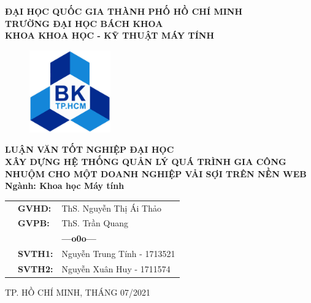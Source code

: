 \documentclass[a4paper]{article}
\begin{document}
\begin{titlepage}
\begin{center}
\textbf{{\Large ĐẠI HỌC QUỐC GIA THÀNH PHỐ HỒ CHÍ MINH \\
TRƯỜNG ĐẠI HỌC BÁCH KHOA \\
KHOA KHOA HỌC - KỸ THUẬT MÁY TÍNH}}
\end{center}

\vspace{0.5cm}

\begin{figure}[h!]
\begin{center}
\includegraphics[width=3.5cm]{Image/hcmut.png}
\end{center}
\end{figure}

\vspace{0.5cm}


\begin{center}
\textbf{{\Large LUẬN VĂN TỐT NGHIỆP ĐẠI HỌC}}\\
\vspace{1cm}
\textbf{{\Large XÂY DỰNG HỆ THỐNG QUẢN LÝ QUÁ TRÌNH GIA CÔNG NHUỘM CHO MỘT DOANH NGHIỆP VẢI SỢI TRÊN NỀN WEB}}\\
\vspace{1cm}
\textbf{{\Large Ngành: Khoa học Máy tính}}
\end{center}

\vspace{2cm}

\begin{table}[h]
\renewcommand{\arraystretch}{1.5}
\begin{tabular}{lll}
\hspace{5 cm}
& \textbf{{\large GVHD:}} & {\large ThS. Nguyễn Thị Ái Thảo} \\
& \textbf{{\large GVPB:}} & {\large ThS. Trần Quang}\\
&  & \textbf{---o0o---} \\
& \textbf{{\large SVTH1:}} & {\large Nguyễn Trung Tính - 1713521} \\
& \textbf{{\large SVTH2:}} & {\large Nguyễn Xuân Huy - 1711574} \\
\end{tabular}
\end{table}

\begin{center}
{\footnotesize {\large TP. HỒ CHÍ MINH, THÁNG 07/2021}}
\end{center}
\end{titlepage}
\end{document}
